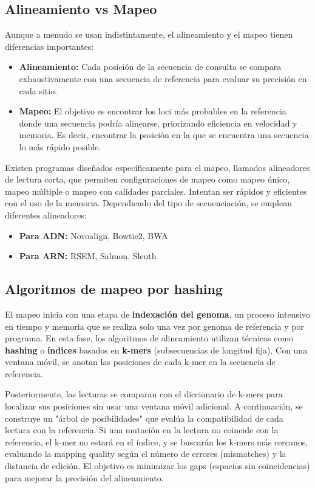 \subsection{Alineamiento vs Mapeo}
Aunque a menudo se usan indistintamente, el alineamiento y el mapeo tienen diferencias importantes:
\begin{itemize}
\item \textbf{Alineamiento:} Cada posición de la secuencia de consulta se compara exhaustivamente con una secuencia de referencia para evaluar su precisión en cada sitio.
\item \textbf{Mapeo:} El objetivo es encontrar los loci más probables en la referencia donde una secuencia podría alinearse, priorizando eficiencia en velocidad y memoria. Es decir, encontrar la posición en la que se encuentra una secuencia lo más rápido posible.
\end{itemize}

Existen programas diseñados específicamente para el mapeo, llamados alineadores de lectura corta, que permiten configuraciones de mapeo como mapeo único, mapeo múltiple o mapeo con calidades parciales. Intentan ser rápidos y eficientes con el uso de la memoria. Dependiendo del tipo de secuenciación, se emplean diferentes alineadores:
\begin{itemize}
\item \textbf{Para ADN:} Novoalign, Bowtie2, BWA
\item \textbf{Para ARN:} RSEM, Salmon, Sleuth
\end{itemize}

\subsection{Algoritmos de mapeo por hashing}
El mapeo inicia con una etapa de \textbf{indexación del genoma}, un proceso intensivo en tiempo y memoria que se realiza solo una vez por genoma de referencia y por programa. En esta fase, los algoritmos de alineamiento utilizan técnicas como \textbf{hashing} o \textbf{índices} basados en \textbf{k-mers} (subsecuencias de longitud fija). Con una ventana móvil, se anotan las posiciones de cada k-mer en la secuencia de referencia.

Posteriormente, las lecturas se comparan con el diccionario de k-mers para localizar sus posiciones sin usar una ventana móvil adicional. A continuación, se construye un "árbol de posibilidades" que evalúa la compatibilidad de cada lectura con la referencia. Si una mutación en la lectura no coincide con la referencia, el k-mer no estará en el índice, y se buscarán los k-mers más cercanos, evaluando la mapping quality según el número de errores (mismatches) y la distancia de edición. El objetivo es minimizar los gaps (espacios sin coincidencias) para mejorar la precisión del alineamiento.

